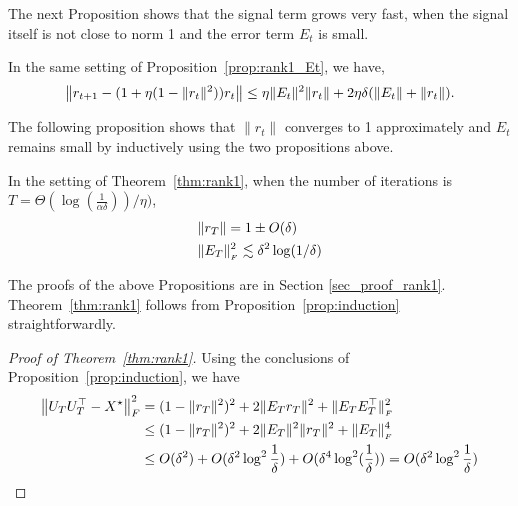 The next Proposition shows that the signal term grows very fast, when the signal itself is not close to norm 1 and the error term $E_t$ is small. 
\begin{prop}\label{prop:rank1_Rt}
In the same setting of Proposition~\ref{prop:rank1_Et}, we have, 
	\begin{align}\label{eq:rank1_Rt_dynamic}
		\left\|r_{t+1} - (1 + \eta(1 - \|r_t\|^2)) r_t\right\| \le
		\eta \|E_t\|^2 \|r_t\| +  2\eta\delta(\|E_t\| + \|r_t\|).
	\end{align}
\end{prop}

The following proposition shows that $\|r_t\|$ converges to 1 approximately and $E_t$ remains small by inductively using the two propositions above. 

\begin{prop}\label{prop:induction}
In the setting of Theorem~\ref{thm:rank1}, when the number of iterations is $T = \Theta(\log(\frac 1 {\alpha\delta})) / \eta)$,
	\begin{align}
		& \|r_T\| = 1\pm O(\delta) \\
		& \|E_T\|_{_{F}}^2 \lesssim \delta^2\log(1/\delta) 	\end{align}
\end{prop}

The proofs of the above Propositions are in Section \ref{sec_proof_rank1}.
Theorem~\ref{thm:rank1} follows from Proposition~\ref{prop:induction} straightforwardly. 

\begin{proof}[Proof of Theorem~\ref{thm:rank1}]
Using the conclusions of Proposition~\ref{prop:induction}, we have
	\begin{align*}
	\left\|U_T U_T^{\top} - {X}^\star\right\|_{F}^2
	&= (1 - \|r_T\|^2)^2 + 2 \|E_T r_T\|^2 + \|E_T E_T^{\top}\|_{_{F}}^2 \\
	&\le (1 - \|r_T\|^2)^2 + 2 \|E_T\|^2 \|r_T\|^2 + \|E_T\|_{_{F}}^4 \\
	&\le O(\delta^2) + O(\delta^2\log^2{\frac 1{\delta}}) +
	O(\delta^4 \log^2(\frac 1 {\delta}))
	= O(\delta^2\log^2{\frac 1 {\delta}})
	\end{align*}
\end{proof}

